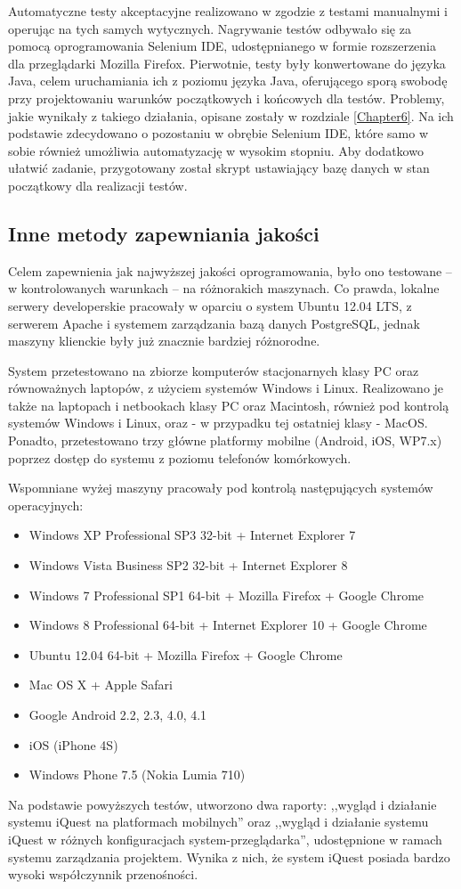 Automatyczne testy akceptacyjne realizowano w zgodzie z testami manualnymi i operując na tych samych wytycznych. Nagrywanie testów odbywało się za pomocą oprogramowania Selenium IDE, udostępnianego w formie rozszerzenia dla przeglądarki Mozilla Firefox. Pierwotnie, testy były konwertowane do języka Java, celem uruchamiania ich z poziomu języka Java, oferującego sporą swobodę przy projektowaniu warunków początkowych i końcowych dla testów. Problemy, jakie wynikały z takiego działania, opisane zostały w rozdziale \ref{Chapter6}. Na ich podstawie zdecydowano o pozostaniu w obrębie Selenium IDE, które samo w sobie również umożliwia automatyzację w wysokim stopniu. Aby dodatkowo ułatwić zadanie, przygotowany został skrypt ustawiający bazę danych w stan początkowy dla realizacji testów.

\subsection{Inne metody zapewniania jakości}
\label{Chapter714}

Celem zapewnienia jak najwyższej jakości oprogramowania, było ono testowane -- w kontrolowanych warunkach -- na różnorakich maszynach. Co prawda, lokalne serwery developerskie pracowały w oparciu o system Ubuntu 12.04 LTS, z serwerem Apache i systemem zarządzania bazą danych PostgreSQL, jednak maszyny klienckie były już znacznie bardziej różnorodne.

System przetestowano na zbiorze komputerów stacjonarnych klasy PC oraz równoważnych laptopów, z użyciem systemów Windows i Linux. Realizowano je także na laptopach i netbookach klasy PC oraz Macintosh, również pod kontrolą systemów Windows i Linux, oraz - w przypadku tej ostatniej klasy - MacOS. Ponadto, przetestowano trzy główne platformy mobilne (Android, iOS, WP7.x) poprzez dostęp do systemu z poziomu telefonów komórkowych.

Wspomniane wyżej maszyny pracowały pod kontrolą następujących systemów operacyjnych:
\begin{itemize}
\item{Windows XP Professional SP3 32-bit + Internet Explorer 7}
\item{Windows Vista Business SP2 32-bit + Internet Explorer 8}
\item{Windows 7 Professional SP1 64-bit + Mozilla Firefox + Google Chrome}
\item{Windows 8 Professional 64-bit + Internet Explorer 10 + Google Chrome}
\item{Ubuntu 12.04 64-bit + Mozilla Firefox + Google Chrome}
\item{Mac OS X + Apple Safari}
\item{Google Android 2.2, 2.3, 4.0, 4.1}
\item{iOS (iPhone 4S)}
\item{Windows Phone 7.5 (Nokia Lumia 710)}
\end{itemize}

Na podstawie powyższych testów, utworzono dwa raporty: ,,wygląd i działanie systemu iQuest na platformach mobilnych'' oraz ,,wygląd i działanie systemu iQuest w różnych konfiguracjach system-przeglądarka'', udostępnione w ramach systemu zarządzania projektem\cite{Redmine:ProjDocs}. Wynika z nich, że system iQuest posiada bardzo wysoki współczynnik przenośności.